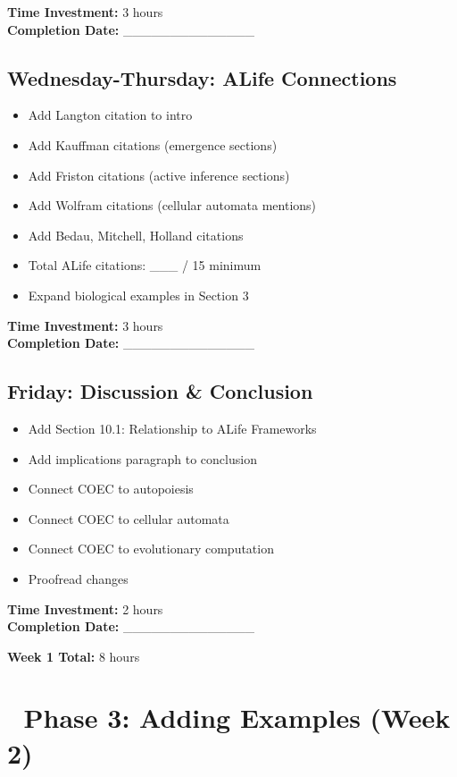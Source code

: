\documentclass[11pt]{article}
\begin{document}
\textbf{Time Investment:} 3 hours\\
\textbf{Completion Date:} \_\_\_\_\_\_\_\_\_\_\_\_\_\_

\subsection*{Wednesday-Thursday: ALife Connections}
\begin{itemize}[label=$\square$]
    \item Add Langton citation to intro
    \item Add Kauffman citations (emergence sections)
    \item Add Friston citations (active inference sections)
    \item Add Wolfram citations (cellular automata mentions)
    \item Add Bedau, Mitchell, Holland citations
    \item Total ALife citations: \_\_\_ / 15 minimum
    \item Expand biological examples in Section 3
\end{itemize}

\textbf{Time Investment:} 3 hours\\
\textbf{Completion Date:} \_\_\_\_\_\_\_\_\_\_\_\_\_\_

\subsection*{Friday: Discussion \& Conclusion}
\begin{itemize}[label=$\square$]
    \item Add Section 10.1: Relationship to ALife Frameworks
    \item Add implications paragraph to conclusion
    \item Connect COEC to autopoiesis
    \item Connect COEC to cellular automata
    \item Connect COEC to evolutionary computation
    \item Proofread changes
\end{itemize}

\textbf{Time Investment:} 2 hours\\
\textbf{Completion Date:} \_\_\_\_\_\_\_\_\_\_\_\_\_\_

\textbf{Week 1 Total:} 8 hours

\section*{🔬 Phase 3: Adding Examples (Week 2)}
\end{document}

